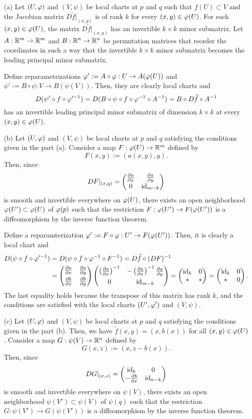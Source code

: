 \documentclass{../../large}
\begin{document}
\begin{pf}
(a)
Let $(U,\varphi)$ and $(V,\psi)$ be local charts at $p$ and $q$ such that $f(U)\subset V$ and the Jacobian matrix $D\tilde f|_{(x,y)}$ is of rank $k$ for every $(x,y)\in\varphi(U)$.
For each $(x,y)\in\varphi(U)$, the matrix $D\tilde f|_{(x,y)}$ has an invertible $k\times k$ minor submatrix.
Let $A:\mathbb{R}^m\to\mathbb{R}^m$ and $B:\mathbb{R}^n\to\mathbb{R}^n$ be permutation matrices that reorder the coordinates in such a way that the invertible $k\times k$ minor submatrix becomes the leading principal minor submatrix.

Define reparametrizations $\varphi':=A\circ\varphi:U\to A(\varphi(U))$ and $\psi':=B\circ\psi:V\to B(\psi(V))$.
Then, they are clearly local charts and
\[D(\psi'\circ f\circ\varphi'^{-1})=D(B\circ\psi\circ f\circ\varphi^{-1}\circ A^{-1})=B\circ D\widetilde f\circ A^{-1}\]
has an invertible leading principal minor submatrix of dimension $k\times k$ at every $(x,y)\in\varphi(U)$.

(b)
Let $(U,\varphi)$ and $(V,\psi)$ be local charts at $p$ and $q$ satisfying the conditions given in the part (a).
Consider a map $F:\varphi(U)\to\mathbb{R}^m$ defined by
\[F(x,y):=(a(x,y),y).\]
Then, since
\[DF|_{(x,y)}=\mat{\pd{a}{x}&\pd{a}{y}\\0&\id_{m-k}}\]
is smooth and invertible everywhere on $\varphi(U)$, there exists an open neighborhood $\varphi(U')\subset\varphi(U)$ of $\varphi(p)$ such that the restriction $F:\varphi(U')\to F(\varphi(U'))$ is a diffeomorphism by the inverse function theorem.

Define a reparamterization $\varphi':=F\circ\varphi:U'\to F(\varphi(U'))$.
Then, it is clearly a local chart and
\begin{align*}
D(\psi\circ f\circ\f'^{-1})
&=D(\psi\circ f\circ\f^{-1}\circ F^{-1})
=D\tilde f\circ(DF)^{-1}\\
&=\mat{\pd{a}{x}&\pd{a}{y}\\[4pt]\pd{b}{x}&\pd{b}{y}}\mat{\left(\pd{a}{x}\right)^{-1}&-\left(\pd{a}{x}\right)^{-1}\pd{a}{y}\\[4pt]0&\id_{m-k}}
=\mat{\id_k&0\\\ast&\ast}=\mat{\id_k&0\\\ast&0}.
\end{align*}
The last equality holds because the transpose of this matrix has rank $k$, and the conditions are satisfied with the local charts $(U',\varphi')$ and $(V,\psi)$.

(c)
Let $(U,\varphi)$ and $(V,\psi)$ be local charts at $p$ and $q$ satisfying the conditions given in the part (b).
Then, we have $\tilde f(x,y)=(x,b(x))$ for all $(x,y)\in\varphi(U)$.
Consider a map $G:\psi(V)\to\mathbb{R}^n$ defined by
\[G(x,z):=(x,z-b(x)).\]
Then, since
\[DG|_{(x,z)}=\mat{\id_k&0\\-\pd{b}{x}&\id_{n-k}}\]
is smooth and invertible everywhere on $\psi(V)$, there exists an open neighborhood $\psi(V')\subset\psi(V)$ of $\psi(q)$ such that the restriction $G:\psi(V')\to G(\psi(V'))$ is a diffeomorphism by the inverse function theorem.


\end{pf}
\end{document}
